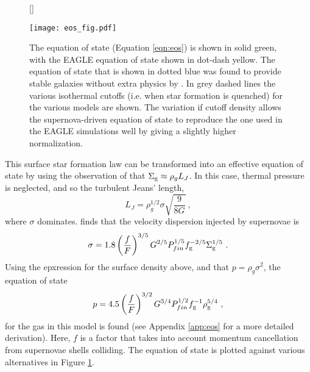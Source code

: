 \begin{figure}
    [\FBwidth]
    {\caption{The equation of state (Equation \ref{eqn:eos}) is shown in solid green, with the EAGLE equation of state shown in dot-dash yellow. The equation of state that is shown in dotted blue was found to provide stable galaxies without extra physics by \citep{springel_cosmological_2003}. In grey dashed lines the various isothermal cutoffs (i.e. when star formation is quenched) for the various models are shown. The variation if cutoff density allows the supernova-driven equation of state to reproduce the one used in the EAGLE simulations well by giving a slightly higher normalization.}\label{fig:eos}}
    {\texttt{[image: eos\_fig.pdf]}}
\end{figure}

This surface star formation law can be transformed into an effective equation of state by using the observation of \citet{schaye_model-independent_2001} that $\Sigma_\mathrm{g} \approx \rho_g L_J$.
In this case, thermal pressure is neglected, and so the turbulent Jeans' length,
\begin{equation}
\label{eqn:jeans}
L_J = \rho_g^{1/2} \sigma \sqrt{\frac{9}{8G}}~,
\end{equation}
where $\sigma$ dominates.
\citet{martizzi_supernova_2015} finds that the velocity dispersion injected by supernovae is
\begin{equation}
\label{eqn:martdisp}
\sigma = 1.8 \left(\frac{f}{F}\right)^{{3/5}} G^{{2/5}} P_{fin}^{{1/5}} f_\mathrm{g}^{{-2/5}} \Sigma_\mathrm{g}^{{1/5}}~.
\end{equation}
Using the epxression for the surface density above, and that $p = \rho_g \sigma^2$, the equation of state
\begin{equation}
\label{eqn:eos}
p = 4.5\left(\frac{f}{F}\right)^{{3/2}} G^{{3/4}} P_{fin}^{{1/2}} f_\mathrm{g}^{-1} \rho_\mathrm{g}^{{5/4}}~,
\end{equation}
for the gas in this model is found (see Appendix \ref{app:eos} for a more detailed derivation).
Here, $f$ is a factor that takes into account momentum cancellation from supernovae shells colliding.
The equation of state is plotted against various alternatives in Figure \ref{fig:eos}.
